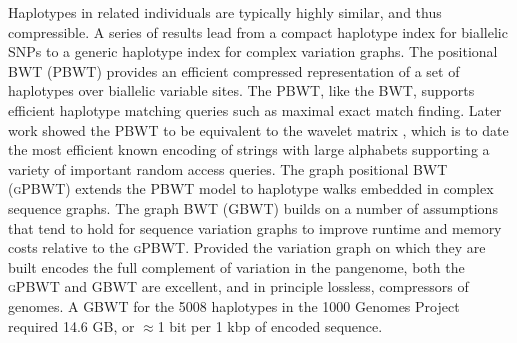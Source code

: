 Haplotypes in related individuals are typically highly similar, and thus compressible.
A series of results lead from a compact haplotype index for biallelic SNPs to a generic haplotype index for complex variation graphs.
The positional BWT (\textsc{PBWT}) \cite{Durbin_2014} provides an efficient compressed representation of a set of haplotypes over biallelic variable sites.
The \textsc{PBWT}, like the BWT, supports efficient haplotype matching queries such as maximal exact match finding.
Later work \cite{Gagie_2017} showed the PBWT to be equivalent to the wavelet matrix \cite{Claude_2015}, which is to date the most efficient known encoding of strings with large alphabets supporting a variety of important random access queries.
The graph positional BWT (\textsc{gPBWT}) \cite{Novak_2017} extends the PBWT model to haplotype walks embedded in complex sequence graphs.
The graph BWT (\textsc{GBWT}) \cite{siren2018haplotype} builds on a number of assumptions that tend to hold for sequence variation graphs to improve runtime and memory costs relative to the \textsc{gPBWT}.
Provided the variation graph on which they are built encodes the full complement of variation in the pangenome, both the \textsc{gPBWT} and \textsc{GBWT} are excellent, and in principle lossless, compressors of genomes.
A \textsc{GBWT} for the 5008 haplotypes in the 1000 Genomes Project required 14.6 GB, or $\approx$1 bit per 1 kbp of encoded sequence.



